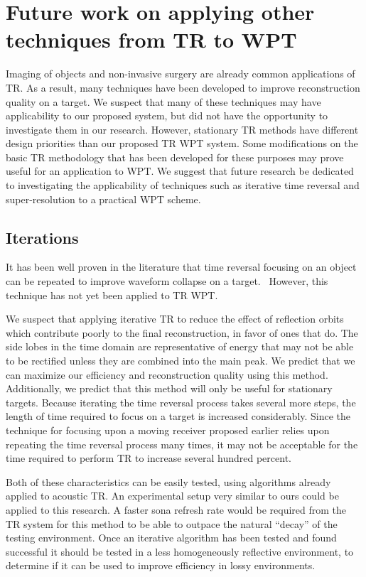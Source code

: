 \section{Future work on applying other techniques from TR to WPT}
\label{sec:future-tr}
Imaging of objects and non-invasive surgery are already common applications of TR.
As a result, many techniques have been developed to improve reconstruction quality on a target.
We suspect that many of these techniques may have applicability to our proposed system, but did not
have the opportunity to investigate them in our research.
However, stationary TR methods have different design priorities than our proposed TR WPT system.
Some modifications on the basic TR methodology that has been developed for these purposes may prove useful for an application to WPT. We suggest that future research be dedicated to investigating the applicability of techniques such as iterative time reversal and super-resolution to a practical WPT scheme.

\subsection{Iterations}

It has been well proven in the literature that time reversal focusing on an object can be repeated to improve waveform collapse on a target.~\cite{prada_iterative_1991} However, this technique has not yet been applied to TR WPT.

We suspect that applying iterative TR to reduce the effect of reflection orbits which contribute poorly to the final reconstruction, in favor of ones that do. The side lobes in the time domain are representative of energy that may not be able to be rectified unless they are combined into the main peak. We predict that we can maximize our efficiency and reconstruction quality using this method. Additionally, we predict that this method will only be useful for stationary targets. Because iterating the time reversal process takes several more steps, the length of time required to focus on a target is increased considerably. Since the technique for focusing upon a moving receiver proposed earlier relies upon repeating the time reversal process many times, it may not be acceptable for the time required to perform TR to increase several hundred percent. 

Both of these characteristics can be easily tested, using algorithms already applied to acoustic TR. An experimental setup very similar to ours could be applied to this research. A faster sona refresh rate would be required from the TR system for this method to be able to outpace the natural ``decay'' of the testing environment. Once an iterative algorithm has been tested and found successful it should be tested in a less homogeneously reflective environment, to determine if it can be used to improve efficiency in lossy environments.

